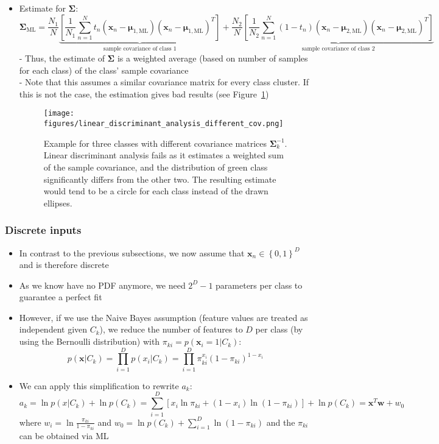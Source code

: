 \begin{itemize}
	\item Estimate for $\bm{\Sigma}$: 
	$$\bm{\Sigma}_{\text{ML}} = \frac{N_1}{N}\underbrace{\left[\frac{1}{N_1} \sum\limits_{n=1}^{N} t_n\left(\bm{x}_n - \bm{\mu}_{1,\text{ML}}\right)\left(\bm{x}_n - \bm{\mu}_{1,\text{ML}}\right)^T\right]}_{\text{sample covariance of class 1}} + \frac{N_2}{N}\underbrace{\left[\frac{1}{N_2} \sum\limits_{n=1}^{N} (1-t_n)\left(\bm{x}_n - \bm{\mu}_{2,\text{ML}}\right)\left(\bm{x}_n - \bm{\mu}_{2,\text{ML}}\right)^T\right]}_{\text{sample covariance of class 2}}$$
	- Thus, the estimate of $\bm{\Sigma}$ is a weighted average (based on number of samples for each class) of the class' sample covariance\\
	- Note that this assumes a similar covariance matrix for every class cluster. If this is not the case, the estimation gives bad results (see Figure~\ref{img:linear_discriminative_analysis_different_cov})
	\begin{figure}[ht]
		\centering
		\texttt{[image: figures/linear\_discriminant\_analysis\_different\_cov.png]}
		\caption{Example for three classes with different covariance matrices $\bm{\Sigma}_k^{-1}$. Linear discriminant analysis fails as it estimates a weighted sum of the sample covariance, and the distribution of green class significantly differs from the other two. The resulting estimate would tend to be a circle for each class instead of the drawn ellipses.}
		\label{img:linear_discriminative_analysis_different_cov}
	\end{figure}
\end{itemize}
\subsubsection{Discrete inputs}
\begin{itemize}
	\item In contrast to the previous subsections, we now assume that $\bm{x}_n \in\left\{0,1\right\}^D$ and is therefore discrete
	\item As we know have no PDF anymore, we need $2^D - 1$ parameters per class to guarantee a perfect fit
	\item However, if we use the Naive Bayes assumption (feature values are treated as independent given $C_k$), we reduce the number of features to $D$ per class (by using the Bernoulli distribution) with $\pi_{ki} = p(\bm{x}_i = 1|C_k)$:
	$$p\left(\bm{x}|C_k\right) = \prod\limits_{i=1}^{D}p\left(x_i|C_k\right) = \prod\limits_{i=1}^{D} \pi_{ki}^{x_i}\left(1 - \pi_{ki}\right)^{1-x_i}$$
	\item We can apply this simplification to rewrite $a_k$:
	$$a_k = \ln p\left(x|C_k\right) + \ln p\left(C_k\right)  = \sum\limits_{i=1}^{D}\left[x_i\ln \pi_{ki} + (1 - x_i)\ln (1 - \pi_{ki}) \right] + \ln p\left(C_k\right) = \bm{x}^T\bm{w} + w_0 $$
	 where $w_i=\ln \frac{\pi_{ki}}{1 - \pi_{ki}}$ and $w_0 = \ln p\left(C_k\right) + \sum_{i=1}^{D}\ln \left(1-\pi_{ki}\right)$ and the $\pi_{ki}$ can be obtained via ML
\end{itemize}
